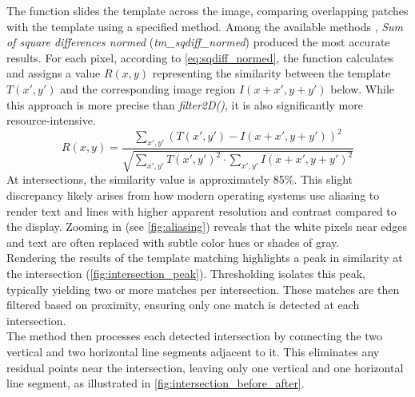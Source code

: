 The function slides the template across the image, comparing overlapping patches with the template using a specified method. Among the available methods \cite{opencv_comparison_methods_2024}, \textit{Sum of square differences normed} (\textit{tm\_sqdiff\_normed}) produced the most accurate results. For each pixel, according to \autoref{eq:sqdiff_normed}, the function calculates and assigns a value $R(x, y)$ representing the similarity between the template $T(x', y')$ and the corresponding image region $I(x + x', y + y')$ below. While this approach is more precise than \textit{filter2D()}, it is also significantly more resource-intensive.
\begin{equation}
    \label{eq:sqdiff_normed}
    R(x,y) = \frac{\sum_{x',y'} (T(x',y') - I(x + x', y + y'))^2}{\sqrt{\sum_{x',y'} T(x',y')^2 \cdot \sum_{x',y'} I(x + x', y + y')^2}}
\end{equation}
At intersections, the similarity value is approximately 85$\%$. This slight discrepancy likely arises from how modern operating systems use aliasing to render text and lines with higher apparent resolution and contrast compared to the display. Zooming in (see \autoref{fig:aliasing}) reveals that the white pixels near edges and text are often replaced with subtle color hues or shades of gray.\\
Rendering the results of the template matching highlights a peak in similarity at the intersection (\autoref{fig:intersection_peak}). Thresholding isolates this peak, typically yielding two or more matches per intersection. These matches are then filtered based on proximity, ensuring only one match is detected at each intersection.\\
The method then processes each detected intersection by connecting the two vertical and two horizontal line segments adjacent to it. This eliminates any residual points near the intersection, leaving only one vertical and one horizontal line segment, as illustrated in \autoref{fig:intersection_before_after}.

